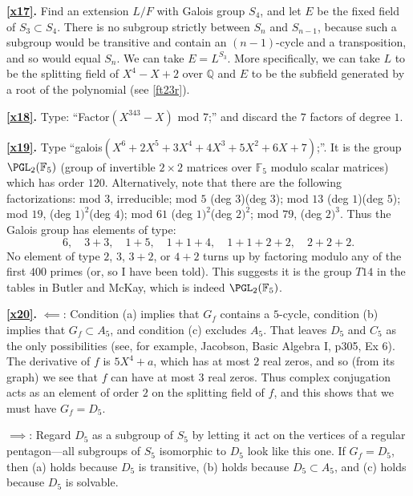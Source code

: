 \documentclass[a4paper,11pt,final,openany]{memoir}
\theoremstyle{nonumberplain}
\begin{document}
\medskip\noindent\textbf{\ref{x17}.} Find an extension $L/F$ with Galois group
$S_{4}$, and let $E$ be the fixed field of $S_{3}\subset S_{4}$. There is no
subgroup strictly between $S_{n}$ and $S_{n-1}$, because such a subgroup would
be transitive and contain an $(n-1)$-cycle and a transposition, and so would
equal $S_{n}$. We can take $E=L^{S_{3}}$. More specifically, we can take $L$
to be the splitting field of $X^{4}-X+2$ over $\mathbb{Q}{}$ and $E$ to be the
subfield generated by a root of the polynomial (see \ref{ft23r}).

\medskip\noindent\textbf{\ref{x18}.} Type: ``Factor$(X^{343}-X)$ mod 7;'' and
discard the $7$ factors of degree $1$.

\medskip\noindent\textbf{\ref{x19}.} Type \textquotedblleft galois$(X^{6}%
+2X^{5}+3X^{4}+4X^{3}+5X^{2}+6X+7)$;\textquotedblright. It is the group
$\PGL_{2}(\mathbb{F}_{5})$ (group of invertible $2\times2$ matrices over
$\mathbb{F}_{5}$ modulo scalar matrices) which has order $120$. Alternatively,
note that there are the following factorizations: mod $3$, irreducible; mod
$5$ (deg $3$)(deg $3$); mod $13$ (deg $1$)(deg $5$); mod $19 $, (deg $1)^{2}%
$(deg $4$); mod $61$ (deg $1)^{2}$(deg $2)^{2}$; mod $79$, (deg $2)^{3}$. Thus
the Galois group has elements of type:
\[
6,\quad3+3,\quad1+5,\quad1+1+4,\quad1+1+2+2,\quad2+2+2.
\]
No element of type $2$, $3$, $3+2$, or $4+2$ turns up by factoring modulo any
of the first $400$ primes (or, so I have been told). This suggests it is the
group $T14$ in the tables in Butler and McKay, which is indeed $\PGL_{2}%
(\mathbb{F}_{5})$.

\medskip\noindent\textbf{\ref{x20}.} $\impliedby$: Condition (a) implies that
$G_{f}$ contains a $5$-cycle, condition (b) implies that $G_{f}\subset A_{5}$,
and condition (c) excludes $A_{5}$. That leaves $D_{5}$ and $C_{5}$ as the
only possibilities (see, for example, Jacobson, Basic Algebra I, p305, Ex 6).
The derivative of $f$ is $5X^{4}+a$, which has at most $2$ real zeros, and so
(from its graph) we see that $f$ can have at most $3$ real zeros. Thus complex
conjugation acts as an element of order $2$ on the splitting field of $f$, and
this shows that we must have $G_{f}=D_{5}$.

\noindent$\implies$: Regard $D_{5}$ as a subgroup of $S_{5}$ by letting it act
on the vertices of a regular pentagon---all subgroups of $S_{5}$ isomorphic to
$D_{5}$ look like this one. If $G_{f}=D_{5}$, then (a) holds because $D_{5}$
is transitive, (b) holds because $D_{5}\subset A_{5}$, and (c) holds because
$D_{5}$ is solvable.
\end{document}

